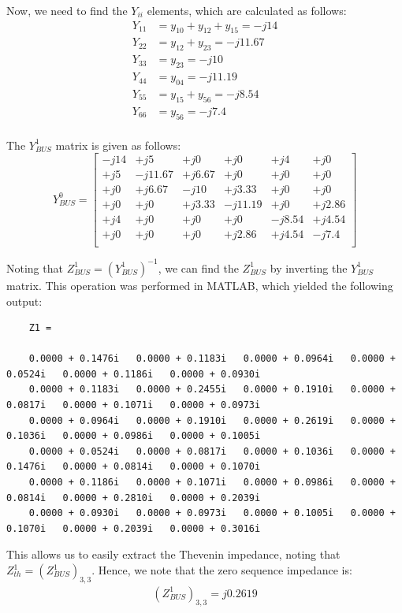 \documentclass{article}
\begin{document}
Now, we need to find the $Y_{ii}$ elements, which are calculated as follows:
\begin{align*}
Y_{11} &= y_{10} + y_{12} + y_{15} = -j14\\
Y_{22} &= y_{12} + y_{23} = -j11.67\\
Y_{33} &= y_{23} = -j10\\
Y_{44} &= y_{04} = -j11.19\\
Y_{55} &= y_{15} + y_{56} = -j8.54\\
Y_{66} &= y_{56} = -j7.4\\
\end{align*}

The $Y^1_{BUS}$ matrix is given as follows:
\hspace{-1cm}
\[
Y^0_{BUS} = 
\begin{bmatrix}
-j14 &  +j5 &  +j0 &  +j0 &  +j4 &  +j0\\
+j5 &  -j11.67 &  +j6.67 &  +j0 &  +j0 &  +j0\\
+j0 &  +j6.67 &  -j10 &  +j3.33 &  +j0 &  +j0\\
+j0 &  +j0 &  +j3.33 &  -j11.19 &  +j0 &  +j2.86\\
+j4 &  +j0 &  +j0 &  +j0 &  -j8.54 &  +j4.54\\
+j0 &  +j0 &  +j0 &  +j2.86 &  +j4.54 &  -j7.4\\
\end{bmatrix}
\]

Noting that $Z^1_{BUS} = (Y^1_{BUS})^{-1}$, we can find the $Z^1_{BUS}$ by inverting the $Y^1_{BUS}$ matrix. This operation was performed in MATLAB, which yielded the following output:
{\footnotesize
	\begin{verbatim}
	Z1 =
	
	0.0000 + 0.1476i   0.0000 + 0.1183i   0.0000 + 0.0964i   0.0000 + 0.0524i   0.0000 + 0.1186i   0.0000 + 0.0930i
	0.0000 + 0.1183i   0.0000 + 0.2455i   0.0000 + 0.1910i   0.0000 + 0.0817i   0.0000 + 0.1071i   0.0000 + 0.0973i
	0.0000 + 0.0964i   0.0000 + 0.1910i   0.0000 + 0.2619i   0.0000 + 0.1036i   0.0000 + 0.0986i   0.0000 + 0.1005i
	0.0000 + 0.0524i   0.0000 + 0.0817i   0.0000 + 0.1036i   0.0000 + 0.1476i   0.0000 + 0.0814i   0.0000 + 0.1070i
	0.0000 + 0.1186i   0.0000 + 0.1071i   0.0000 + 0.0986i   0.0000 + 0.0814i   0.0000 + 0.2810i   0.0000 + 0.2039i
	0.0000 + 0.0930i   0.0000 + 0.0973i   0.0000 + 0.1005i   0.0000 + 0.1070i   0.0000 + 0.2039i   0.0000 + 0.3016i
	\end{verbatim}
}

This allows us to easily extract the Thevenin impedance, noting that $Z^1_{th} = (Z^1_{BUS})_{3,3}$. Hence, we note that the zero sequence impedance is:
\begin{align*}
(Z^1_{BUS})_{3,3} = j0.2619
\end{align*}
\end{document}
